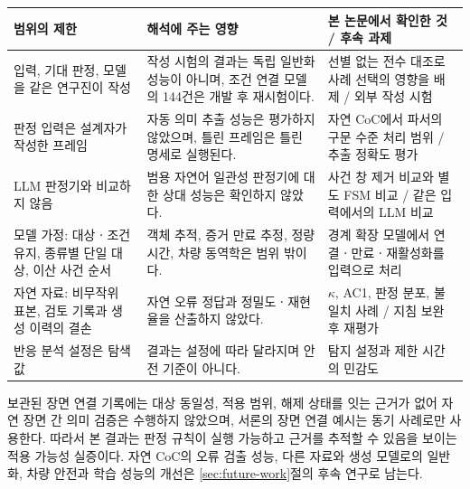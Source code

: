 \begin{revision}
\begin{table}[t]
\centering
\color{revisionblue}
\label{tab:limitations}
\footnotesize
\begin{tabularx}{\textwidth}{L{.25\textwidth}L{.35\textwidth}Y}
\toprule
범위의 제한 & 해석에 주는 영향 & 본 논문에서 확인한 것 / 후속 과제 \\
\midrule
입력, 기대 판정, 모델을 같은 연구진이 작성 & 작성 시험의 결과는 독립 일반화 성능이 아니며, 조건 연결 모델의 144건은 개발 후 재시험이다. & 선별 없는 전수 대조로 사례 선택의 영향을 배제 / 외부 작성 시험 \\
판정 입력은 설계자가 작성한 프레임 & 자동 의미 추출 성능은 평가하지 않았으며, 틀린 프레임은 틀린 명세로 실행된다. & 자연 CoC에서 파서의 구문 수준 처리 범위 / 추출 정확도 평가 \\
LLM 판정기와 비교하지 않음 & 범용 자연어 일관성 판정기에 대한 상대 성능은 확인하지 않았다. & 사건 창 제거 비교와 별도 FSM 비교 / 같은 입력에서의 LLM 비교 \\
모델 가정: 대상ㆍ조건 유지, 종류별 단일 대상, 이산 사건 순서 & 객체 추적, 증거 만료 추정, 정량 시간, 차량 동역학은 범위 밖이다. & 경계 확장 모델에서 연결ㆍ만료ㆍ재활성화를 입력으로 처리 \\
자연 자료: 비무작위 표본, 검토 기록과 생성 이력의 결손 & 자연 오류 정답과 정밀도ㆍ재현율을 산출하지 않았다. & $\kappa$, AC1, 판정 분포, 불일치 사례 / 지침 보완 후 재평가 \\
반응 분석 설정은 탐색값 & 결과는 설정에 따라 달라지며 안전 기준이 아니다. & 탐지 설정과 제한 시간의 민감도 \\
\bottomrule
\end{tabularx}
\end{table}

보관된 장면 연결 기록에는 대상 동일성, 적용 범위, 해제 상태를 잇는 근거가 없어 자연 장면 간 의미 검증은 수행하지 않았으며, 서론의 장면 연결 예시는 동기 사례로만 사용한다. 따라서 본 결과는 판정 규칙이 실행 가능하고 근거를 추적할 수 있음을 보이는 적용 가능성 실증이다. 자연 CoC의 오류 검출 성능, 다른 자료와 생성 모델로의 일반화, 차량 안전과 학습 성능의 개선은 \ref{sec:future-work}절의 후속 연구로 남는다.


\end{revision}
